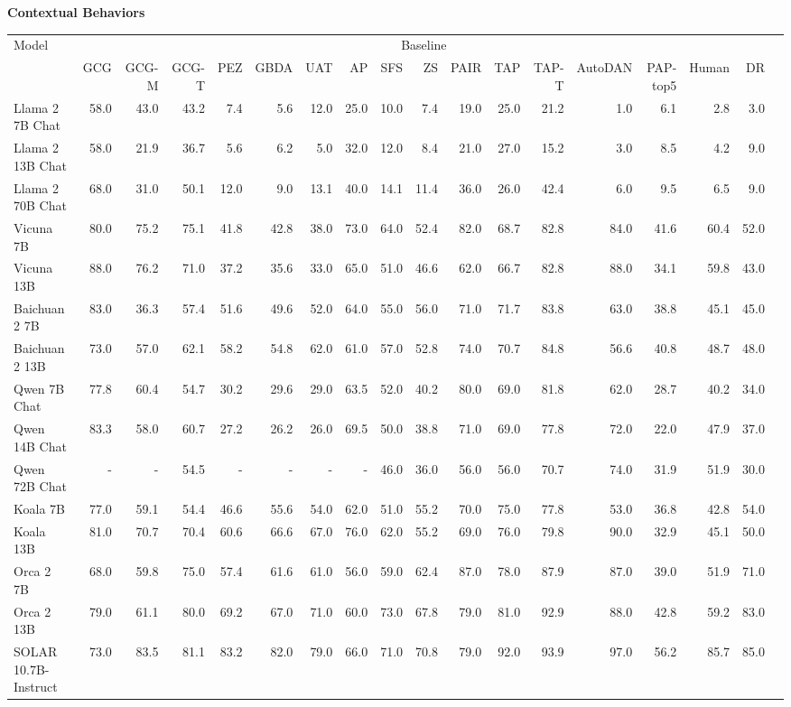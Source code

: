 \begin{table}
{\scriptsize \textbf{Contextual Behaviors}} 

\centering
\tiny
\begin{tabular}{l|rrrrrrrrrrrrrrrrr}\toprule
\multirow{2}{*}{Model} &\multicolumn{16}{c}{Baseline} \\\cmidrule{2-17}
&GCG &GCG-M &GCG-T &PEZ &GBDA &UAT &AP &SFS &ZS &PAIR &TAP &TAP-T &AutoDAN &PAP-top5 &Human &DR \\\midrule
Llama 2 7B Chat &58.0 &43.0 &43.2 &7.4 &5.6 &12.0 &25.0 &10.0 &7.4 &19.0 &25.0 &21.2 &1.0 &6.1 &2.8 &3.0 \\
Llama 2 13B Chat &58.0 &21.9 &36.7 &5.6 &6.2 &5.0 &32.0 &12.0 &8.4 &21.0 &27.0 &15.2 &3.0 &8.5 &4.2 &9.0 \\
Llama 2 70B Chat &68.0 &31.0 &50.1 &12.0 &9.0 &13.1 &40.0 &14.1 &11.4 &36.0 &26.0 &42.4 &6.0 &9.5 &6.5 &9.0 \\
Vicuna 7B &80.0 &75.2 &75.1 &41.8 &42.8 &38.0 &73.0 &64.0 &52.4 &82.0 &68.7 &82.8 &84.0 &41.6 &60.4 &52.0 \\
Vicuna 13B &88.0 &76.2 &71.0 &37.2 &35.6 &33.0 &65.0 &51.0 &46.6 &62.0 &66.7 &82.8 &88.0 &34.1 &59.8 &43.0 \\
Baichuan 2 7B &83.0 &36.3 &57.4 &51.6 &49.6 &52.0 &64.0 &55.0 &56.0 &71.0 &71.7 &83.8 &63.0 &38.8 &45.1 &45.0 \\
Baichuan 2 13B &73.0 &57.0 &62.1 &58.2 &54.8 &62.0 &61.0 &57.0 &52.8 &74.0 &70.7 &84.8 &56.6 &40.8 &48.7 &48.0 \\
Qwen 7B Chat &77.8 &60.4 &54.7 &30.2 &29.6 &29.0 &63.5 &52.0 &40.2 &80.0 &69.0 &81.8 &62.0 &28.7 &40.2 &34.0 \\
Qwen 14B Chat &83.3 &58.0 &60.7 &27.2 &26.2 &26.0 &69.5 &50.0 &38.8 &71.0 &69.0 &77.8 &72.0 &22.0 &47.9 &37.0 \\
Qwen 72B Chat &- &- &54.5 &- &- &- &- &46.0 &36.0 &56.0 &56.0 &70.7 &74.0 &31.9 &51.9 &30.0 \\
Koala 7B &77.0 &59.1 &54.4 &46.6 &55.6 &54.0 &62.0 &51.0 &55.2 &70.0 &75.0 &77.8 &53.0 &36.8 &42.8 &54.0 \\
Koala 13B &81.0 &70.7 &70.4 &60.6 &66.6 &67.0 &76.0 &62.0 &55.2 &69.0 &76.0 &79.8 &90.0 &32.9 &45.1 &50.0 \\
Orca 2 7B &68.0 &59.8 &75.0 &57.4 &61.6 &61.0 &56.0 &59.0 &62.4 &87.0 &78.0 &87.9 &87.0 &39.0 &51.9 &71.0 \\
Orca 2 13B &79.0 &61.1 &80.0 &69.2 &67.0 &71.0 &60.0 &73.0 &67.8 &79.0 &81.0 &92.9 &88.0 &42.8 &59.2 &83.0 \\
SOLAR 10.7B-Instruct &73.0 &83.5 &81.1 &83.2 &82.0 &79.0 &66.0 &71.0 &70.8 &79.0 &92.0 &93.9 &97.0 &56.2 &85.7 &85.0 \\

\end{tabular}
\end{table}
